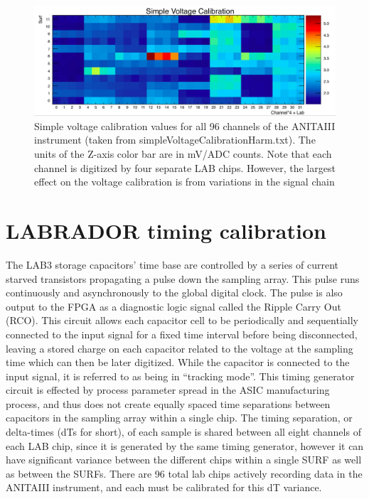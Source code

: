 			
	\begin{figure}
		\centering
		\includegraphics[width=\textwidth]{figures/ADCtoVolts.png}
		\caption{Simple voltage calibration values for all 96 channels of the ANITAIII instrument (taken from simpleVoltageCalibrationHarm.txt).  The units of the Z-axis color bar are in mV/ADC counts.  Note that each channel is digitized by four separate LAB chips.  However, the largest effect on the voltage calibration is from variations in the signal chain}
		\label{fig:adcTomV}
	\end{figure}
		



\section{LABRADOR timing calibration}
		The LAB3 storage capacitors' time base are controlled by a series of current starved transistors propagating a pulse down the sampling array.  This pulse runs continuously and asynchronously to the global digital clock.  The pulse is also output to the FPGA as a diagnostic logic signal called the Ripple Carry Out (RCO).  This circuit allows each capacitor cell to be periodically and sequentially connected to the input signal for a fixed time interval before being disconnected, leaving a stored charge on each capacitor related to the voltage at the sampling time which can then be later digitized.  While the capacitor is connected to the input signal, it is referred to as being in ``tracking mode''.  This timing generator circuit is effected by process parameter spread in the ASIC manufacturing process, and thus does not create equally spaced time separations between capacitors in the sampling array within a single chip.  The timing separation, or delta-times (dTs for short), of each sample is shared between all eight channels of each LAB chip, since it is generated by the same timing generator, however it can have significant variance between the different chips within a single SURF as well as between the SURFs.  There are 96 total lab chips actively recording data in the ANITAIII instrument, and each must be calibrated for this dT variance.

